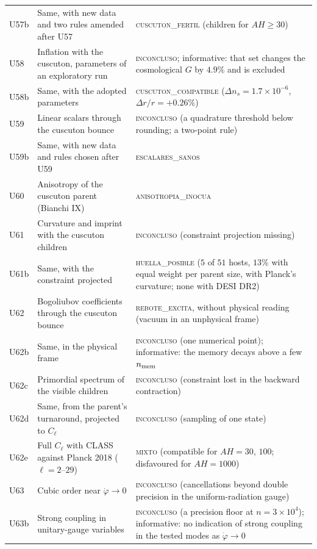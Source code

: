 \documentclass[11pt,a4paper]{article}
\begin{document}
\begin{small}
\begin{longtable}{L{1.3cm}L{6.0cm}L{7.6cm}}
U57b & Same, with new data and two rules amended after U57 & \textsc{cuscuton\_fertil} (children for $AH\ge30$) \\
U58 & Inflation with the cuscuton, parameters of an exploratory run & \textsc{inconcluso}; informative: that set changes the cosmological $G$ by $4.9\%$ and is excluded \\
U58b & Same, with the adopted parameters & \textsc{cuscuton\_compatible} ($\Delta n_s=1.7\times10^{-6}$, $\Delta r/r=+0.26\%$) \\
U59 & Linear scalars through the cuscuton bounce & \textsc{inconcluso} (a quadrature threshold below rounding; a two-point rule) \\
U59b & Same, with new data and rules chosen after U59 & \textsc{escalares\_sanos} \\
U60 & Anisotropy of the cuscuton parent (Bianchi IX) & \textsc{anisotropia\_inocua} \\
U61 & Curvature and imprint with the cuscuton children & \textsc{inconcluso} (constraint projection missing) \\
U61b & Same, with the constraint projected & \textsc{huella\_posible} ($5$ of $51$ hosts, $13\%$ with equal weight per parent size, with Planck's curvature; none with DESI DR2) \\
U62 & Bogoliubov coefficients through the cuscuton bounce & \textsc{rebote\_excita}, without physical reading (vacuum in an unphysical frame) \\
U62b & Same, in the physical frame & \textsc{inconcluso} (one numerical point); informative: the memory decays above a few $n_{\rm mem}$ \\
U62c & Primordial spectrum of the visible children & \textsc{inconcluso} (constraint lost in the backward contraction) \\
U62d & Same, from the parent's turnaround, projected to $C_\ell$ & \textsc{inconcluso} (sampling of one state) \\
U62e & Full $C_\ell$ with CLASS against Planck 2018 ($\ell=2$--$29$) & \textsc{mixto} (compatible for $AH=30$, $100$; disfavoured for $AH=1000$) \\
U63 & Cubic order near $\dot\varphi\to0$ & \textsc{inconcluso} (cancellations beyond double precision in the uniform-radiation gauge) \\
U63b & Strong coupling in unitary-gauge variables & \textsc{inconcluso} (a precision floor at $n=3\times10^4$); informative: no indication of strong coupling in the tested modes as $\dot\varphi\to0$ \\

\end{longtable}
\end{small}
\end{document}
